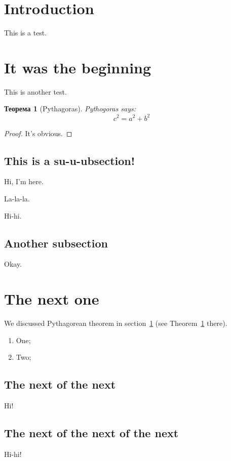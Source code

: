 \documentclass[notitlepage]{article}
\newtheorem{theorem}{Теорема}
\begin{document}
    \section*{Introduction}
    This is a test.

    \section{It was the beginning}\label{sec:beg}
        This is another test.

        \begin{theorem}[Pythagoras]\label{thm:Pyth}
            Pythogoras says:
            $$
                c^2 = a^2 + b^2
            $$
        \end{theorem}
        \begin{proof}
            It's obvious.
        \end{proof}
        \subsection{This is a su-u-ubsection!}
        Hi, I'm here.

        La-la-la.

        Hi-hi.
        \subsection{Another subsection}
        Okay.

    \section{The next one}
        We discussed Pythagorean theorem in section~\ref{sec:beg} (see
        Theorem~\ref{thm:Pyth} there).
        \begin{enumerate}
            \item One;
            \item Two;
        \end{enumerate}
        \subsection{The next of the next}
        Hi!
        \subsection{The next of the next of the next}
        Hi-hi!
\end{document}
